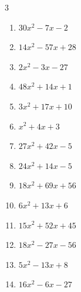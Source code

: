 \begin{multicols}{3}
\begin{enumerate}
  \item $30x^{2}-7x-2$

        \phantom{$=(6x+1)(5x-2)$}

  \item $14x^{2}-57x+28$

        \phantom{$=(7x-4)(2x-7)$}

  \item $2x^{2}-3x-27$

        \phantom{$=(x+3)(2x-9)$}

\columnbreak %

\resetques

  \item $48x^{2}+14x+1$

        \phantom{$=(8x+1)(6x+1)$}

  \item $3x^{2}+17x+10$

        \phantom{$=(x+5)(3x+2)$}

  \item $x^{2}+4x+3$

        \phantom{$=(x+1)(x+3)$}

  \item $27x^{2}+42x-5$

        \phantom{$=(9x-1)(3x+5)$}

  \item $24x^{2}+14x-5$

        \phantom{$=(4x-1)(6x+5)$}

  \item $18x^{2}+69x+56$

        \phantom{$=(6x+7)(3x+8)$}

  \item $6x^{2}+13x+6$

        \phantom{$=(2x+3)(3x+2)$}

  \item $15x^{2}+52x+45$

        \phantom{$=(5x+9)(3x+5)$}

  \item $18x^{2}-27x-56$

        \phantom{$=(6x+7)(3x-8)$}

  \item $5x^{2}-13x+8$

        \phantom{$=(x-1)(5x-8)$}

\columnbreak %

  \item $16x^{2}-6x-27$


\end{enumerate}
\end{multicols}
